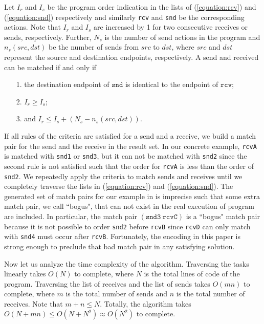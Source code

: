 Let $I_r$ and $I_s$ be the program order indication in the lists of (\ref{equation:rcv}) and (\ref{equation:snd}) respectively and similarly \texttt{rcv} and \texttt{snd} be the corresponding actions. Note that $I_r$ and $I_s$ are increased by 1 for two consecutive receives or sends, respectively. Further, $N_s$ is the number of send actions in the program and $n_s(\mathit{src},\mathit{dst})$ be the number of sends from $\mathit{src}$ to $\mathit{dst}$, where $\mathit{src}$ and $\mathit{dst}$ represent the source and destination endpoints, respectively. A send and received can be matched if and only if
\begin{itemize}
\item[1.] the destination endpoint of $\mathtt{snd}$ is identical to the endpoint of $\mathtt{rcv}$;
\item[2.] $I_r \geq I_s$;
\item[3.] and $I_r \leq I_s + (N_s - n_s(\mathit{src},\mathit{dst}))$.
\end{itemize}
If all rules of the criteria are satisfied for a send and a receive, we build a match pair for the send and the receive in the result set. In our concrete example, \texttt{rcvA} is matched with \texttt{snd1} or \texttt{snd3}, but it can not be matched with \texttt{snd2} since the second rule is not satisfied such that the order for \texttt{rcvA} is less than the order of \texttt{snd2}. We repeatedly apply the criteria to match sends and receives until we completely traverse the lists in (\ref{equation:rcv}) and (\ref{equation:snd}). The generated set of match pairs for our example in  is imprecise such that some extra match pair, we call ``bogus", that can not exist in the real execution of program are included. In particular, the match pair $(\mathtt{snd3}\ \mathtt{rcvC})$ is a ``bogus" match pair because it is not possible to order \texttt{snd2} before \texttt{rcvB} since \texttt{rcvD} can only match with \texttt{snd4} must occur after \texttt{rcvB}. Fortunately, the encoding in this paper is strong enough to preclude that bad match pair in any satisfying solution.


Now let us analyze the time complexity of the algorithm. Traversing the tasks linearly takes $O(N)$ to complete, where $N$ is the total lines of code of the program. Traversing the list of receives and the list of sends takes $O(mn)$ to complete, where $m$ is the total number of sends and $n$ is the total number of receives. Note that $m + n \le N$. Totally, the algorithm takes $O(N + mn) \leq O(N + N^2) \approx O(N^2)$ to complete.

